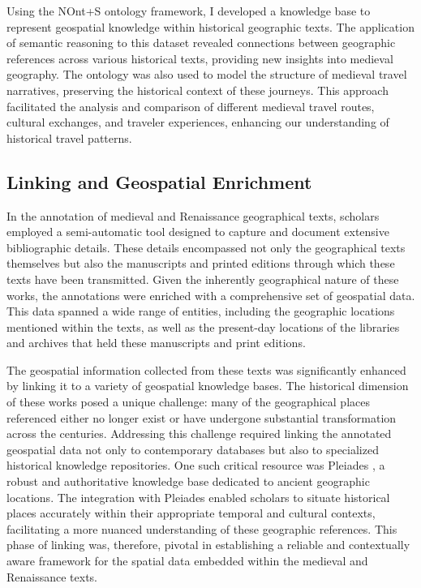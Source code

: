 Using the NOnt+S ontology framework, I developed a knowledge base to represent geospatial knowledge within historical geographic texts. The application of semantic reasoning to this dataset revealed connections between geographic references across various historical texts, providing new insights into medieval geography. The ontology was also used to model the structure of medieval travel narratives, preserving the historical context of these journeys. This approach facilitated the analysis and comparison of different medieval travel routes, cultural exchanges, and traveler experiences, enhancing our understanding of historical travel patterns.

\subsection{Linking and Geospatial Enrichment}\label{VII-subsec:imago-linking}

In the annotation of medieval and Renaissance geographical texts, scholars employed a semi-automatic tool designed to capture and document extensive bibliographic details. These details encompassed not only the geographical texts themselves but also the manuscripts and printed editions through which these texts have been transmitted. Given the inherently geographical nature of these works, the annotations were enriched with a comprehensive set of geospatial data. This data spanned a wide range of entities, including the geographic locations mentioned within the texts, as well as the present-day locations of the libraries and archives that held these manuscripts and print editions.

The geospatial information collected from these texts was significantly enhanced by linking it to a variety of geospatial knowledge bases. The historical dimension of these works posed a unique challenge: many of the geographical places referenced either no longer exist or have undergone substantial transformation across the centuries. Addressing this challenge required linking the annotated geospatial data not only to contemporary databases but also to specialized historical knowledge repositories. One such critical resource was Pleiades \cite{simonPleiadesGazetteerPelagios2016}, a robust and authoritative knowledge base dedicated to ancient geographic locations. The integration with Pleiades enabled scholars to situate historical places accurately within their appropriate temporal and cultural contexts, facilitating a more nuanced understanding of these geographic references. This phase of linking was, therefore, pivotal in establishing a reliable and contextually aware framework for the spatial data embedded within the medieval and Renaissance texts.

